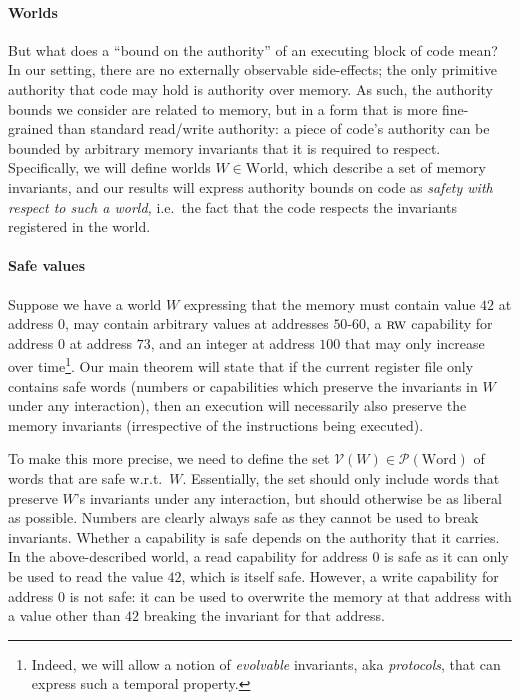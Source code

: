 \documentclass[format=acmsmall, review=true, screen=true]{acmart}
\newcommand{\powerset}[1]{\mathcal{P}(#1)}
\newcommand{\asmType}{\plaindom{AsmType}}
\newcommand{\plaindom}[1]{\mathrm{#1}}
\newcommand{\Words}{\plaindom{Word}}
\newcommand{\Worlds}{\plaindom{World}}
\newcommand{\intr}[2]{\mathcal{#1}}
\newcommand{\valueintr}[1]{\intr{V}{#1}}
\newcommand{\stdvr}{\valueintr{\asmType}}
\newcommand{\plainperm}[1]{\textsc{#1}}
\newcommand{\readwrite}{\plainperm{rw}}
\newenvironment{toplas}{}{}
\begin{document}
\begin{toplas}
\paragraph{Worlds}
But what does a ``bound on the authority'' of an executing block of code mean?
In our setting, there are no externally observable side-effects; the only
primitive authority that code may hold is authority over memory. As such, the
authority bounds we consider are related to memory, but in a form that is more
fine-grained than standard read/write authority: a piece of code's authority can be bounded
by arbitrary memory invariants that it is required to respect. Specifically, we
will define worlds $W \in \Worlds$, which describe a set of memory invariants, and
our results will express authority bounds on code as \emph{safety with respect to such
a world,} i.e.\ the fact that the code respects the invariants registered in
the world.

\paragraph{Safe values}
Suppose we have a world $W$ expressing that the memory must contain
value $42$ at address $0$, may contain arbitrary values at
addresses $50$-$60$, a $\readwrite$ capability for address $0$ at address $73$, and
an integer at address $100$ that may only increase over time\footnote{Indeed, we
  will allow a notion of \emph{evolvable} invariants, aka \emph{protocols}, that can
  express such a temporal property.}. Our main theorem will state that if the
current register file only contains safe words (numbers or capabilities which
preserve the invariants in $W$ under any interaction), then an execution will
necessarily also preserve the memory invariants (irrespective of the instructions being
executed).

To make this more precise, we need to define the set $\stdvr(W) \in
\powerset{\Words}$ of words that are safe w.r.t.\ $W$. Essentially, the set
should only include words that preserve $W$'s invariants under any interaction,
but should otherwise be as liberal as possible. Numbers are clearly always safe
as they cannot be used to break invariants. Whether a capability is safe depends
on the authority that it carries. In the above-described world, a read capability
for address $0$ is safe as it can only be used to read the value $42$, which is
itself safe. However, a write capability for address $0$ is not safe: it can be
used to overwrite the memory at that address with a value other than $42$
breaking the invariant for that address.


\end{toplas}
\end{document}
